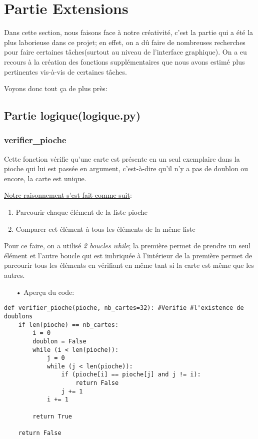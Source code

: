 \section{Partie Extensions}
\hspace{\parindent} Dans cette section, nous faisons face à notre créativité, c'est la partie qui a été la plus laborieuse dans ce projet; en effet, on a dû faire de nombreuses recherches pour faire certaines tâches(surtout au niveau de l'interface graphique). On a eu recours à la création des fonctions supplémentaires que nous avons estimé plus pertinentes vis-à-vis de certaines tâches.
	\par Voyons donc tout ça de plus près:
	\subsection{Partie logique(logique.py)}
	\subsubsection{verifier\_pioche}
	Cette fonction vérifie qu'une carte est présente en un seul exemplaire dans la pioche qui lui est passée en argument, c'est-à-dire qu'il n'y a pas de doublon ou encore, la carte est unique.
	\par \underline{Notre raisonnement s'est fait comme suit}:
	\begin{enumerate}
	\item Parcourir chaque élément de la liste pioche
	\item Comparer cet élément à tous les éléments de la même liste
	\end{enumerate}
	
	\par Pour ce faire, on a utilisé \emph{2 boucles while}; la première permet de prendre un seul élément et l'autre boucle qui est imbriquée à l'intérieur de la première permet de parcourir tous les éléments en vérifiant en même tant si la carte est même que les autres.
	\\
	\begin{itemize}
	\color{blue}\item[•]Aperçu du code:
	\end{itemize}
	
	\lstset{language=Python}
	\lstset{frame=lines}
	\lstset{basicstyle=\footnotesize}
	\begin{lstlisting}
def verifier_pioche(pioche, nb_cartes=32): #Verifie #l'existence de doublons
    if len(pioche) == nb_cartes:
        i = 0
        doublon = False
        while (i < len(pioche)):
            j = 0
            while (j < len(pioche)):
                if (pioche[i] == pioche[j] and j != i):
                    return False
                j += 1
            i += 1

        return True
    
    return False
	\end{lstlisting}
	
